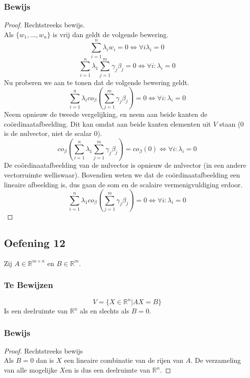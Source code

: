 \documentclass[lineaire_algebra_oplossingen.tex]{subfiles}
\begin{document}
\subsubsection*{Bewijs}
\begin{proof}
Rechtstreeks bewijs.\\
Als $\{w_1,...,w_n\}$ is vrij dan geldt de volgende bewering.
\[\sum_{i=1}^n\lambda_iw_i = 0 \Leftrightarrow \forall i \lambda_i = 0\]
\[
\sum_{i=1}^n \lambda_1\sum_{j=1}^m\gamma_j\beta_j = 0 \Leftrightarrow \forall i:\lambda_i=0
\]
Nu proberen we aan te tonen dat de volgende bewering geldt.
\[
\sum_{i=1}^n \lambda_i co_\beta\left(\sum_{j=1}^m\gamma_j\beta_j\right) = 0 \Leftrightarrow \forall i:\lambda_i=0
\]
Neem opnieuw de tweede vergelijking, en neem aan beide kanten de co\"ordinaatafbeelding. Dit kan omdat aan beide kanten elementen uit $V$ staan ($0$ is de nulvector, niet de scalar $0$).
\[
co_{\beta}\left(\sum_{i=1}^n \lambda_1\sum_{j=1}^m\gamma_j\beta_j\right) = co_{\beta}(0) \Leftrightarrow \forall i:\lambda_i=0
\]
De co\"ordinaatafbeelding van de nulvector is opnieuw de nulvector (in een andere vectorruimte welliswaar). Bovendien weten we dat de co\"ordinaatafbeelding een lineaire afbeelding is, dus gaan de som en de scalaire vermenigvuldiging erdoor.
\[
\sum_{i=1}^n \lambda_1 co_{\beta}\left(\sum_{j=1}^m\gamma_j\beta_j\right) = 0 \Leftrightarrow \forall i:\lambda_i=0
\]
\end{proof}

\subsection{Oefening 12}
Zij $A \in \mathbb{R}^{m\times n}$ en $B \in \mathbb{R}^m$.
\subsubsection*{Te Bewijzen}
\[
V = \{ X \in \mathbb{R}^n | AX = B\}
\]
Is een deelruimte van $\mathbb{R}^n$ als en slechts als $B=0$.
\subsubsection*{Bewijs}
\begin{proof}
Rechtstreeks bewijs\\
Als $B=0$ dan is $X$ een lineaire combinatie van de rijen van $A$. De verzameling van alle mogelijke $X$en is dus een deelruimte van $\mathbb{R}^n$.
\end{proof}
\end{document}
